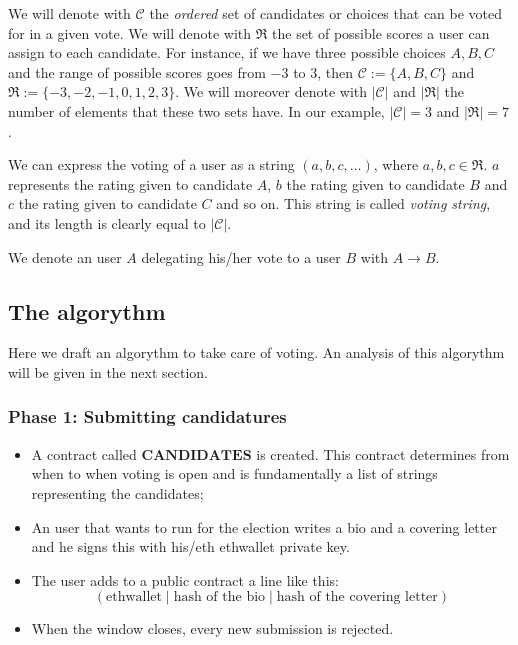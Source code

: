 \documentclass[submission, copyright,creativecommons,sharealike,noncommercial]{eptcs}
\newcommand{\candidates}{\ensuremath{\mathcal{C}} \xspace}
\newcommand{\range}{\ensuremath{\mathfrak{R}}\xspace}
\begin{document}
	\begin{definition}
		We will denote with \candidates the \emph{ordered} set of candidates or choices that can be voted for in a given vote. We will denote with \range the set of possible scores a user can assign to each candidate. For instance, if we have three possible choices $A,B,C$ and the range of possible scores goes from $-3$ to $3$, then $\candidates := \{A, B, C\}$ and $\range := \{-3,-2,-1,0,1,2,3\}$. We will moreover denote with $| \candidates|$ and $|\range|$ the number of elements that these two sets have. In our example, $|\candidates | = 3$ and $|\range|=7$.
	\end{definition}
	
	\begin{definition}\label{voting string}		
		We can express the voting of a user as a string $(a,b,c, \dots)$, where $a,b,c \in \range$. $a$ represents the rating given to candidate $A$, $b$ the rating given to candidate $B$ and $c$ the rating given to candidate $C$ and so on. This string is called \emph{voting string}, and its length is clearly equal to $|\candidates|$.
	\end{definition}
	\begin{definition}
 		We denote an user $A$ delegating his/her vote to a user $B$ with $A \to B$.
	\end{definition}
	
	\subsection{The algorythm}
		Here we draft an algorythm to take care of voting. An analysis of this algorythm will be given in the next section.
		\subsubsection{Phase 1: Submitting candidatures}
		
		\begin{itemize}
			\item A contract called $\textbf{CANDIDATES}$ is created. This contract determines from when to when voting is open and is fundamentally a list of strings representing the candidates;
			
			\item An user that wants to run for the election writes a bio and a covering letter and he signs this with his/eth ethwallet private key.
			
			\item The user adds to a public contract a line like this:
			\[
			(\text{ethwallet} \mid \text{hash of the bio} \mid \text{hash of the covering letter})
			\]
			
			\item When the window closes, every new submission is rejected. 
		\end{itemize}
		
\end{document}
